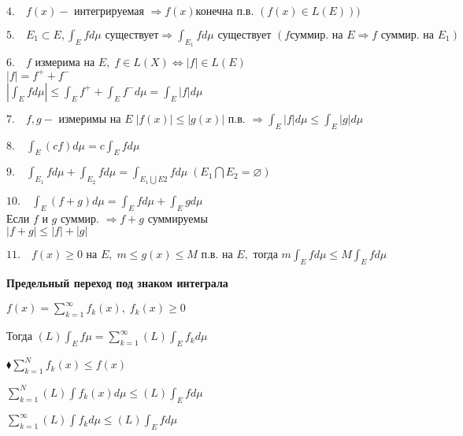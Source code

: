 $4. \quad f(x) - \text{ интегрируемая } \Rightarrow f(x) \text{
конечна п.в. } (f(x) \in L(E)))$

$5. \quad E_1 \subset E, \int_E f d \mu \text{ существует}
\Rightarrow \int_{E_1} f d \mu \text{ существует } (f \text{
суммир. на } E \Rightarrow f \text{ суммир. на } E_1)$

$6. \quad f \text{ измерима на } E, \; f \in L(X) \Leftrightarrow
|f| \in L(E)$\\$|f| = f^+ + f^-$\\$|\int_E f d \mu| \leqslant
\int_E f^+ + \int_E f^- d\mu = \int_E |f| d \mu$

$7. \quad f, g - \text{ измеримы на } E \; |f(x)| \leqslant |g(x)|
\text{ п.в. } \Rightarrow \int_E |f| d \mu \leqslant \int_E |g| d
\mu $

$8. \quad \int_E (cf) d\mu = c \int_E f d \mu$

$9. \quad \int_{E_1} f d \mu + \int_{E_2} f d \mu = \int_{E_1
\bigcup E2} f d \mu \; (E_1 \bigcap E_2 = \varnothing)$

$10. \quad \int_E (f + g)d\mu = \int_E f d \mu + \int_E g d \mu$\\
Если $f$ и $g$ суммир. $\Rightarrow f + g$ суммируемы \\ $|f + g|
\leqslant |f| + |g|$

$11. \quad f(x) \geqslant 0 \text{ на } E, \; m \leqslant g(x)
\leqslant M \text{ п.в. на } E, \text{ тогда } m\int_E f d \mu
\leqslant M \int_E f d \mu$


%
%
%
%
%
%
%
%
%
%
%
%
\begin{center} \textbf{Предельный переход под знаком интеграла} \end{center}

$f(x) = \sum_{k = 1}^{\infty} f_k(x), \; f_k(x) \geqslant 0$

Тогда $(L) \int_E f  \mu = \sum_{k = 1}^{\infty} (L) \int_E f_k d
\mu$

$\blacklozenge \sum_{k = 1}^N f_k(x) \leqslant f(x)$

$\sum_{k=1}^N (L) \int f_k (x) d \mu \leqslant (L) \int_E f d \mu$

$\sum_{k = 1}^{\infty} (L) \int f_k d \mu \leqslant (L) \int_E f d
\mu$

